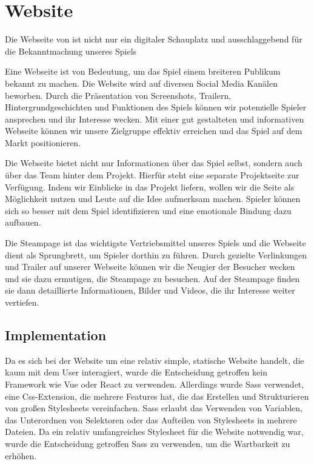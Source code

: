 
\section{Website}\label{sec:website}
\renewcommand{\kapitelautor}{Autor: Nils Hubmann}

%
Die Webseite von \ff ist nicht nur ein digitaler Schauplatz und ausschlaggebend für die Bekanntmachung unseres Spiels

Eine Webseite ist von Bedeutung, um das Spiel einem breiteren Publikum bekannt zu machen.
Die Website wird auf diversen Social Media Kanälen beworben.
Durch die Präsentation von Screenshots, Trailern, Hintergrundgeschichten und Funktionen des Spiels können wir potenzielle Spieler ansprechen und ihr Interesse wecken.
Mit einer gut gestalteten und informativen Webseite können wir unsere Zielgruppe effektiv erreichen und das Spiel auf dem Markt positionieren.

Die Webseite bietet nicht nur Informationen über das Spiel selbst, sondern auch über das Team hinter dem Projekt.
Hierfür steht eine separate Projektseite zur Verfügung.
Indem wir Einblicke in das Projekt liefern, wollen wir die Seite als Möglichkeit nutzen und Leute auf die Idee aufmerksam machen.
Spieler können sich so besser mit dem Spiel identifizieren und eine emotionale Bindung dazu aufbauen.

Die Steampage ist das wichtigste Vertriebsmittel unseres Spiels und die Webseite dient als Sprungbrett, um Spieler dorthin zu führen.
Durch gezielte Verlinkungen und Trailer auf unserer Webseite
können wir die Neugier der Besucher wecken und sie dazu ermutigen, die Steampage zu besuchen.
Auf der Steampage finden sie dann detaillierte Informationen, Bilder und Videos, die ihr Interesse weiter vertiefen.
%

\vfill
\pagebreak

\subsection{Implementation}
\renewcommand{\kapitelautor}{Autor: Marvin Kurka}

Da es sich bei der Website um eine relativ simple, statische Website handelt, die kaum mit dem User interagiert,
wurde die Entscheidung getroffen kein Framework wie \zB Vue oder React zu verwenden.
Allerdings wurde Sass verwendet, eine Css-Extension, die mehrere Features hat, die das Erstellen und Strukturieren
von großen Stylesheets vereinfachen.
Sass erlaubt \zB das Verwenden von Variablen, das Unterordnen von Selektoren oder das Aufteilen von
Stylesheets in mehrere Dateien.
Da ein relativ umfangreiches Stylesheet für die Website notwendig war, wurde die Entscheidung getroffen Sass zu
verwenden, um die Wartbarkeit zu erhöhen.

